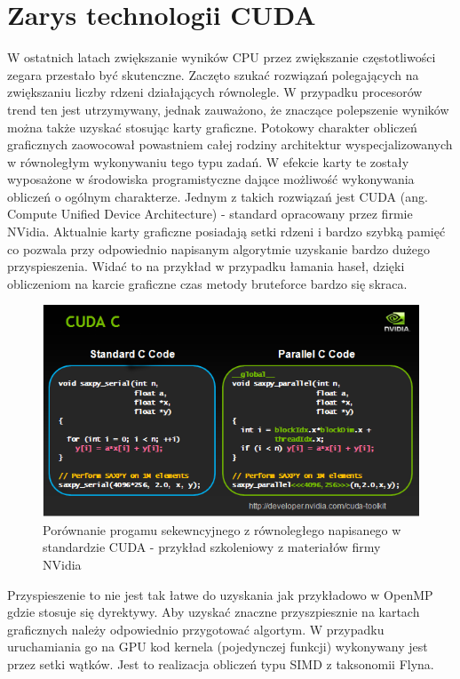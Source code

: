 \documentclass[a4paper,12pt]{article}
\begin{document}
\section*{Zarys technologii CUDA}
W ostatnich latach zwiększanie wyników CPU przez zwiększanie częstotliwości zegara przestało być skutenczne. Zaczęto szukać rozwiązań polegających na zwiększaniu liczby rdzeni działających równolegle. W przypadku procesorów trend ten jest utrzymywany, jednak zauważono, że znaczące polepszenie wyników można także uzyskać stosując karty graficzne. Potokowy charakter obliczeń graficznych zaowocował powastniem całej rodziny architektur wyspecjalizowanych w równoległym wykonywaniu tego typu zadań. W efekcie karty te zostały wyposażone w środowiska programistyczne dające możliwość wykonywania obliczeń o ogólnym charakterze. Jednym z takich rozwiązań jest CUDA (ang. Compute Unified Device Architecture) - standard opracowany przez firmie NVidia. 
	Aktualnie karty graficzne posiadają setki rdzeni i bardzo szybką pamięć co pozwala przy odpowiednio napisanym algorytmie uzyskanie bardzo dużego przyspieszenia. Widać to na przykład w przypadku łamania haseł, dzięki obliczeniom na karcie graficzne czas metody bruteforce bardzo się skraca. 
\begin{figure}[H]
  \vspace{5pt}
  \centering
  \begin{center}
  \includegraphics[width=1.0\textwidth]{images/cuda.png}
  \end{center}
  \caption{Porównanie progamu sekewncyjnego z równoległego napisanego w standardzie CUDA - przykład szkoleniowy z materiałów firmy NVidia}
 \end{figure}
 Przyspieszenie to nie jest tak łatwe do uzyskania jak przykładowo w OpenMP gdzie stosuje się dyrektywy. Aby uzyskać znaczne przyszpiesznie na kartach graficznych należy odpowiednio przygotować algortym. W przypadku uruchamiania go na GPU kod kernela (pojedynczej funkcji) wykonywany jest przez setki wątków. Jest to realizacja obliczeń typu SIMD z taksonomii Flyna. 
\end{document}
